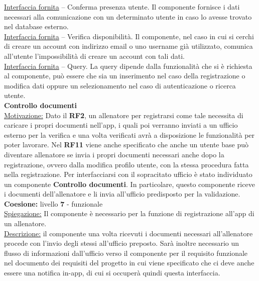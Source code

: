 \documentclass{article}
\begin{document}
      \underline{Interfaccia fornita} – Conferma presenza utente. Il componente fornisce i dati necessari alla comunicazione con un determinato utente in caso lo avesse trovato nel
      database esterno.\\

      \underline{Interfaccia fornita} – Verifica disponibilità. Il componente, nel caso in cui si cerchi di creare un account con indirizzo email o uno username già utilizzato,
      comunica all’utente l’impossibilità di creare un account con tali dati.\\

      \underline{Interfaccia fornita} – Query. La query dipende dalla funzionalità che si è richiesta al componente, può essere che sia un inserimento nel caso della registrazione o
      modifica dati oppure un selezionamento nel caso di autenticazione o ricerca utente.\\



      {\Large\textbf{Controllo documenti}}\\

      \underline{Motivazione:} Dato il \textbf{RF2}, un allenatore per registrarsi come tale necessita di caricare i propri documenti nell’app, i quali poi verranno inviati a un
      ufficio esterno per la verifica e una volta verificati avrà a disposizione le funzionalità per poter lavorare. Nel \textbf{RF11} viene anche specificato che anche un utente base può
      diventare allenatore se invia i propri documenti necessari anche dopo la registrazione, ovvero dalla modifica profilo utente, con la stessa procedura fatta nella registrazione.
      Per interfacciarsi con il sopracitato ufficio è stato individuato un componente \textbf{Controllo documenti}. In particolare, questo componente riceve i documenti dell’allenatore e li
      invia all’ufficio predisposto per la validazione.\\

      \textbf{Coesione:} livello \textbf{7} - funzionale\\

      \underline{Spiegazione:} Il componente è necessario per la funzione di registrazione all’app di un allenatore.\\

      \underline{Descrizione:} il componente una volta ricevuti i documenti necessari all’allenatore procede con l’invio degli stessi all’ufficio preposto. Sarà inoltre necessario un
      flusso di informazioni dall’ufficio verso il componente per il requisito funzionale nel documento dei requisiti del progetto in cui viene specificato che ci deve anche essere una
      notifica in-app, di cui si occuperà quindi questa interfaccia.\\
\end{document}
